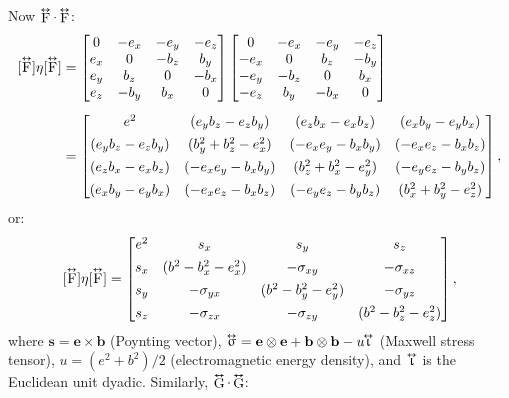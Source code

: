 \documentclass[12pt]{article}
\renewcommand{\vv}[1]{\mathbf{#1}}
\newcommand{\tightoverset}[2]{%
  \mathop{#2}\limits^{\vbox to -.5ex{\kern-0.75ex\hbox{$#1$}\vss}}}
\newcommand{\inlinedy}[1]{\tightoverset{\text{\tiny$\bm\leftrightarrow$}}{#1}}
\newcommand{\capdy}[1]{ \overset{ \text{\tiny$\bm\leftrightarrow$} }{\vphantom{\text{\small{A}}}\smash{#1}} }
\begin{document}
Now $\inlinedy{\mathrm{F}} \cdot \inlinedy{\mathrm{F}}$:
\begin{equation*}
\begin{aligned}
\mkern0mu [\capdy{\mathrm{F}}] \eta [\capdy{\mathrm{F}}]
&=
\begin{bmatrix}
0 & -e_x & -e_y & -e_z \\
e_x & 0 & -b_z & b_y \\
e_y & b_z & 0 & -b_x \\
e_z & -b_y & b_x & 0
\end{bmatrix}
\begin{bmatrix}
0 & -e_x & -e_y & -e_z \\
-e_x & 0 & b_z & -b_y \\
-e_y & -b_z & 0 & b_x \\
-e_z & b_y & -b_x & 0
\end{bmatrix} \\[5pt]
&=
\begin{bmatrix}
e^2 & (e_y b_z - e_z b_y) & (e_z b_x - e_x b_z) & (e_x b_y - e_y b_x) \\[1ex]
(e_y b_z - e_z b_y) & (b_y^2 + b_z^2 - e_x^2) & (-e_x e_y - b_x b_y) & (- e_x e_z - b_x b_z) \\[1ex]
(e_z b_x - e_x b_z) & (-e_x e_y - b_x b_y) & (b_z^2 + b_x^2 - e_y^2)  & (- e_y e_z - b_y b_z) \\[1ex]
(e_x b_y - e_y b_x) & (- e_x e_z - b_x b_z) & (- e_y e_z - b_y b_z) & (b_x^2 + b_y^2 - e_z^2)
\end{bmatrix} ,
\end{aligned}
\end{equation*}
or:
\begin{equation*}
\mkern0mu [\capdy{\mathrm{F}}] \eta [\capdy{\mathrm{F}}]
=
\begin{bmatrix}
e^2 & s_x & s_y & s_z \\[1ex]
s_x & (b^2 - b_x^2 - e_x^2) & - \sigma_{x y} & - \sigma_{x z} \\[1ex]
s_y & - \sigma_{y x} & (b^2 - b_y^2 - e_y^2)  & - \sigma_{y z} \\[1ex]
s_z & - \sigma_{z x} & - \sigma_{z y} & (b^2 - b_z^2 - e_z^2) 
\end{bmatrix} ,
\end{equation*}
where $\vv s = \vv e \times \vv b$ (Poynting vector), $\inlinedy{\upsigma} = \vv e \otimes \vv e + \vv b \otimes \vv b - u \mkern-5mu \inlinedy{\upiota}$ (Maxwell stress tensor), $u = (e^2 + b^2) / 2$ (electromagnetic energy density), and $\inlinedy{\upiota}$ is the Euclidean unit dyadic. Similarly, $\inlinedy{\mathrm{G}} \cdot \inlinedy{\mathrm{G}}$:
\end{document}
